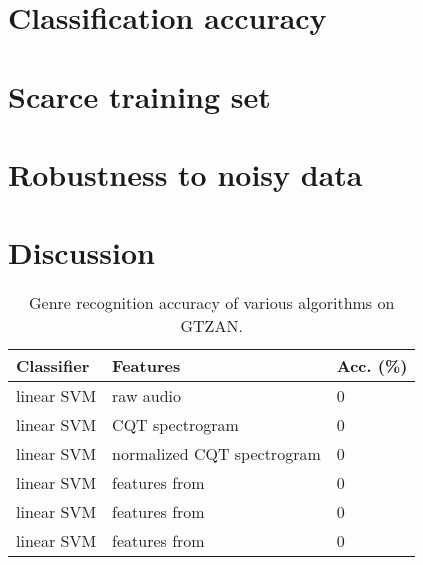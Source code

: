\section{Classification accuracy}


\section{Scarce training set}

\section{Robustness to noisy data}

\section{Discussion}

\begin{table}
	\begin{center}
		\begin{tabular}{|l|l|l|}
			\hline
			Classifier & Features & Acc. (\%) \\
			\hline
			linear SVM & raw audio & 0 \\
			linear SVM & CQT spectrogram & 0 \\
			linear SVM & normalized CQT spectrogram & 0 \\
			linear SVM & features from \eqnref{basispursuit} & 0 \\
			linear SVM & features from \eqnref{minz} & 0 \\
			linear SVM & features from \eqnref{extraction} & 0 \\
			\hline
		\end{tabular}
	\end{center}
	\caption{Genre recognition accuracy of various algorithms on GTZAN.}
	\label{tab:accuracy_comparison}
\end{table}

